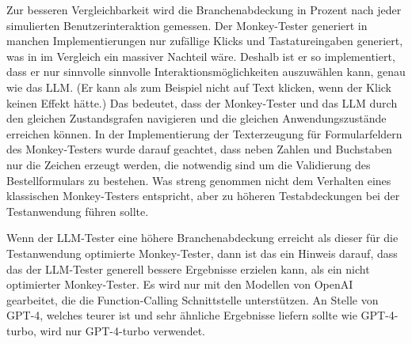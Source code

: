 Zur besseren Vergleichbarkeit wird die Branchenabdeckung in Prozent nach jeder simulierten Benutzerinteraktion gemessen.
Der Monkey-Tester generiert in manchen Implementierungen nur zufällige Klicks und Tastatureingaben generiert, was in im Vergleich ein massiver Nachteil wäre.
Deshalb ist er so implementiert, dass er nur \glqq{}sinnvolle\grqq{} sinnvolle Interaktionsmöglichkeiten auszuwählen kann, genau wie das LLM.
(Er kann als zum Beispiel nicht auf Text klicken, wenn der Klick keinen Effekt hätte.)
Das bedeutet, dass der Monkey-Tester und das LLM durch den gleichen Zustandsgrafen navigieren und die gleichen Anwendungszustände erreichen können.
In der Implementierung der Texterzeugung für Formularfeldern des Monkey-Testers wurde darauf geachtet, dass neben Zahlen und Buchstaben nur die Zeichen erzeugt werden, die notwendig sind um die Validierung des Bestellformulars zu bestehen.
Was streng genommen nicht dem Verhalten eines klassischen Monkey-Testers entspricht, aber zu höheren Testabdeckungen bei der Testanwendung führen sollte.

Wenn der LLM-Tester eine höhere Branchenabdeckung erreicht als dieser für die Testanwendung optimierte Monkey-Tester, dann ist das ein Hinweis darauf, dass das der LLM-Tester generell bessere Ergebnisse erzielen kann, als ein nicht optimierter Monkey-Tester.
Es wird nur mit den Modellen von OpenAI gearbeitet, die die Function-Calling Schnittstelle unterstützen.
An Stelle von GPT-4, welches teurer ist und sehr ähnliche Ergebnisse liefern sollte wie GPT-4-turbo, wird nur GPT-4-turbo verwendet.

